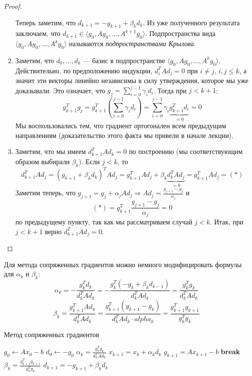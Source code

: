 \documentclass[a4paper, 12pt]{article}
\begin{document}
\begin{proof}
\begin{enumerate}
    Теперь заметим, что $d_{k+1} = -g_{k+1} + \beta_kd_k$. Из уже полученного результата заключаем, что $d_{k+1} \in \langle g_0, Ag_0, \dots, A^{k+1} g_0 \rangle$. Подпространства вида $\langle g_0, Ag_0, \dots, A^{k} g_0 \rangle$ называются \textit{подпространствами Крылова}.
    \item Заметим, что $d_0, \dots, d_k$ --- базис в подпространстве $\langle g_0, Ag_0, \dots, A^{k} g_0 \rangle$. Действительно, по предположению индукции, $d_i^TAd_j = 0$ при $i \neq j$, $i, j \leq k$, а значит эти векторы линейно независимы в силу утверждения, которое мы уже доказывали. Это означает, что $g_j = \sum\limits_{i=0}^{j-1}\gamma_id_i$. Тогда при $j < k+1$:
    $$g_{k+1}^Tg_j = g_{k+1}^T\left(\sum_{i=0}^{j-1}\gamma_id_i\right) = \sum_{i=0}^{j-1} \gamma_i \underbrace{g_{k+1}^Td_i}_{=0} = 0$$
    Мы воспользовались тем, что градиент ортогонален всем предыдущим направлениям (доказательство этого факта мы привели в начале лекции).
    \item Заметим, что мы имеем $d_{k+1}^TAd_k = 0$ по построению (мы соответствующим образом выбирали $\beta_k$). Если $j < k$, то
    $$d_{k+1}^TAd_j = (g_{k+1} + \beta_kd_k)^TAd_j = g_{k+1}^TAd_j + \beta_k \underbrace{d_k^TAd_j}_{=0} = g_{k+1}^TAd_j = (*)$$
    Заметим теперь, что $g_{j+1} = g_j + \alpha_jAd_j \Rightarrow Ad_j = \frac{g_{j+1} - g_j}{\alpha_j}$ и 
    $$(*) = g^T_{k+1}\frac{g_{j+1} - g_j}{\alpha_j} = 0$$
    по предыдущему пункту, так как мы рассматриваем случай $j < k$. Итак, при $j < k+1$ верно $d_{k+1}^TAd_j = 0$.
\end{enumerate}
\end{proof}

Для метода сопряженных градиентов можно немного модифицировать формулы для $\alpha_k$ и $\beta_k$:
$$\alpha_k = -\frac{g_k^Td_k}{d_k^TAd_k} = -\frac{g_k^T(-g_k + \beta_kd_{k-1})}{d_k^TAd_k} = \frac{g_k^Tg_k}{d_k^TAd_k}$$
$$\beta_k = \frac{g_{k+1}^TAd_k}{d_k^TAd_k} = \frac{g_{k+1}^T(g_{k+1} - g_k)}{d_k^TAd_k \cdot alpha_k} = \frac{g_{k+1}^Tg_{k+1}}{g_k^Tg_k}$$

\begin{algorithm}[t]
\caption{Метод сопряженных градиентов}\label{alg:CG}
\begin{algorithmic}[1]
\State $g_0 \gets Ax_0 - b$
\State $d_0 \gets -g_0$
    \State $\alpha_k = \frac{g_k^Tg_k}{d_k^TAd_k}$
    \State $x_{k+1} = x_k + \alpha_kd_k$
    \State $g_{k+1} = Ax_{k+1} - b$
     \Then
        \State\textbf{break}
    \EndIf
    \State $\beta_k = \frac{g_{k+1}^Tg_{k+1}}{g_k^Tg_k}$
    \State $d_{k+1} = -g_{k+1} + \beta_kd_k$
\EndFor
\end{algorithmic}
\end{algorithm}
\end{document}
